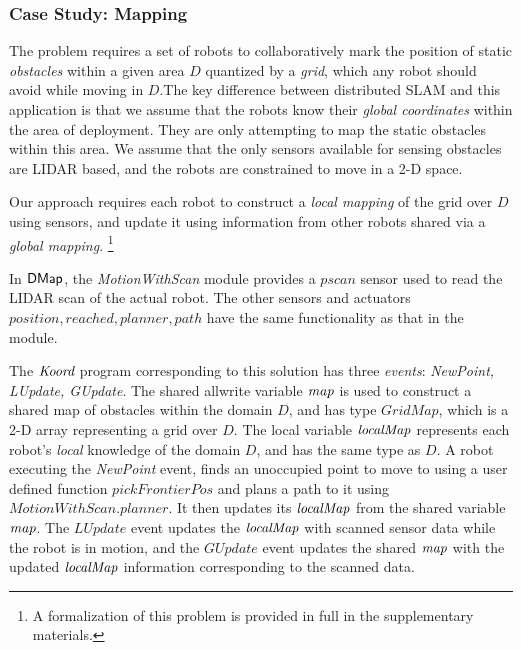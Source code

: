 \subsubsection*{Case Study: Mapping}

 The problem requires a set of robots to collaboratively mark the position of static \emph{obstacles} within a given area $D$ quantized by a \emph{grid}, which any robot should avoid while moving in $D$.The key difference between distributed SLAM and this application is that we assume that the robots know their \emph{global coordinates} within the area of deployment. They are only attempting to map the static obstacles within this area. We assume that the only sensors available for sensing obstacles are LIDAR based, and the robots are constrained to move in a 2-D space.


 Our approach requires each robot to construct a \emph{local mapping} of the grid over $D$ using sensors, and update it using information from other robots shared via a \emph{global mapping}. \footnote{A formalization of this problem is provided in full in the supplementary materials. }

\newcommand{\MotionWithScan}{\emph{MotionWithScan}\xspace}

In ${\sf DMap}$, the \MotionWithScan module provides a $\mathit{pscan}$ sensor used to read the LIDAR scan of the actual robot. The other sensors and actuators $\mathit{position,reached,planner,path}$ have the same functionality as that in the \Motion module.

 The $\emph{Koord}$ program corresponding to this solution has three \emph{events}: \emph{NewPoint, LUpdate, GUpdate}. The shared allwrite variable $\mathit{map}$ is used to construct a shared map of obstacles within the domain $D$, and has type $\mathit{GridMap}$, which is a 2-D array representing a grid over $D$. The local variable $\mathit{localMap}$ represents each robot's \emph{local} knowledge of the domain $D$, and has the same type as $D$. A robot executing the \emph{NewPoint} event, finds an unoccupied point to move to using a user defined function $\mathit{pickFrontierPos}$ and plans a path to it using $\mathit{MotionWithScan.planner}$. It then updates its $\mathit{localMap}$ from the shared variable $\mathit{map}$. The $\mathit{LUpdate}$ event updates the $\mathit{localMap}$ with scanned sensor data while the robot is in motion, and the $\mathit{GUpdate}$ event updates the shared $\mathit{map}$ with the updated $\mathit{localMap}$ information corresponding to the scanned data.




